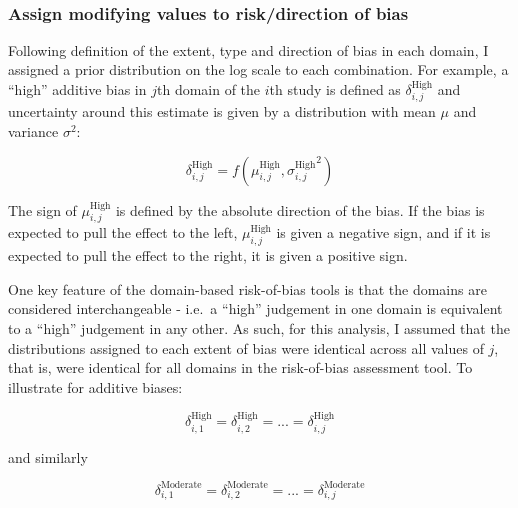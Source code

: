 \documentclass[a4paper, twoside]{templates/ociamthesis}
\begin{document}
~

\hypertarget{assign-modifying-values-to-riskdirection-of-bias}{%
\subsubsection{Assign modifying values to risk/direction of bias}\label{assign-modifying-values-to-riskdirection-of-bias}}

Following definition of the extent, type and direction of bias in each domain, I assigned a prior distribution on the log scale to each combination. For example, a ``high'' additive bias in \(j\)th domain of the \(i\)th study is defined as \(\delta_{i,j}^{\mathrm{High}}\) and uncertainty around this estimate is given by a distribution with mean \(\mu\) and variance \(\sigma^{2}\):

\begin{equation}
  \delta_{i,j}^{\mathrm{High}} = f(\mu_{i,j}^{\mathrm{High}}, {\sigma_{i,j}^{\mathrm{High}}}^{2})
  \label{eq:additive-single}
\end{equation}

The sign of \(\mu_{i,j}^{\mathrm{High}}\) is defined by the absolute direction of the bias. If the bias is expected to pull the effect to the left, \(\mu_{i,j}^{\mathrm{High}}\) is given a negative sign, and if it is expected to pull the effect to the right, it is given a positive sign.

One key feature of the domain-based risk-of-bias tools is that the domains are considered interchangeable - i.e.~a ``high'' judgement in one domain is equivalent to a ``high'' judgement in any other. As such, for this analysis, I assumed that the distributions assigned to each extent of bias were identical across all values of \(j\), that is, were identical for all domains in the risk-of-bias assessment tool. To illustrate for additive biases:

\[
\delta_{i,1}^{\mathrm{High}} = \delta_{i,2}^{\mathrm{High}} = ... = \delta_{i,j}^{\mathrm{High}}
\]

and similarly

\[
\delta_{i,1}^{\mathrm{Moderate}} = \delta_{i,2}^{\mathrm{Moderate}} = ... = \delta_{i,j}^{\mathrm{Moderate}}
\]
\end{document}
